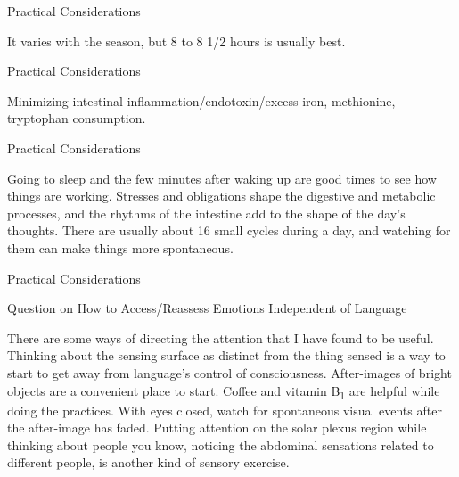 \documentclass[11pt,oneside,openany,extrafontsizes]{memoir}
\begin{document}
\begin{standalonequote}{Practical Considerations}

    \begin{answer}
        It varies with the season, but 8 to 8 1/2 hours is usually best.
    \end{answer}
\end{standalonequote}

\begin{standalonequote}{Practical Considerations}

    \begin{answer}
        Minimizing intestinal inflammation/endotoxin/excess iron, methionine, tryptophan consumption.
    \end{answer}
\end{standalonequote}

\begin{standalonequote}{Practical Considerations}

    \begin{answer}
        Going to sleep and the few minutes after waking up are good times to see how things are working. Stresses and obligations shape the digestive and metabolic processes, and the rhythms of the intestine add to the shape of the day's thoughts. There are usually about 16 small cycles during a day, and watching for them can make things more spontaneous.
    \end{answer}
\end{standalonequote}

\begin{standalonequote}{Practical Considerations}
    \begin{note}
        Question on How to Access/Reassess Emotions Independent of Language
    \end{note}

    \begin{answer}
        There are some ways of directing the attention that I have found to be useful. Thinking about the sensing surface as distinct from the thing sensed is a way to start to get away from language's control of consciousness. After-images of bright objects are a convenient place to start. Coffee and vitamin B\textsubscript{1} are helpful while doing the practices. With eyes closed, watch for spontaneous visual events after the after-image has faded. Putting attention on the solar plexus region while thinking about people you know, noticing the abdominal sensations related to different people, is another kind of sensory exercise.
    \end{answer}
\end{standalonequote}
\end{document}
